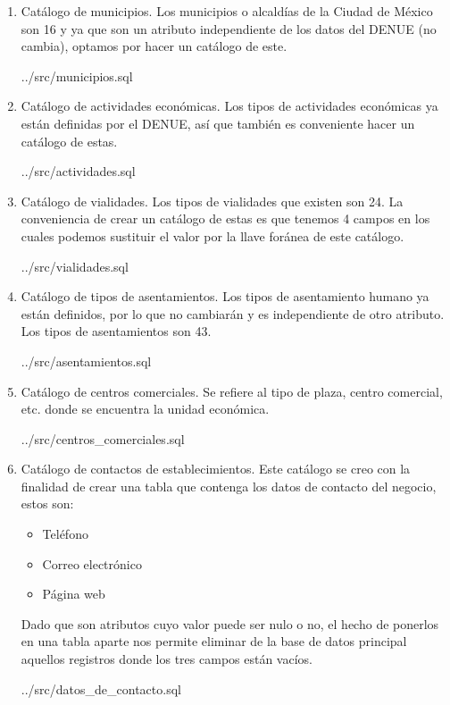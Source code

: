 \documentclass{article}
\begin{document}
\begin{enumerate}
    \item Catálogo de municipios.
    Los municipios o alcaldías de la Ciudad de México son 16 y ya que son un
    atributo independiente de los datos del DENUE (no cambia), optamos por hacer
    un catálogo de este.
    
        {../src/municipios.sql}

    \item Catálogo de actividades económicas.
    Los tipos de actividades económicas ya están definidas por el DENUE, así que
    también es conveniente hacer un catálogo de estas.
    
    {../src/actividades.sql}

    \item Catálogo de vialidades.
    Los tipos de vialidades que existen son 24. La conveniencia de crear un
    catálogo de estas es que tenemos 4 campos en los cuales podemos sustituir el
    valor por la llave foránea de este catálogo.
    
    {../src/vialidades.sql}

    \item Catálogo de tipos de asentamientos.
    Los tipos de asentamiento humano ya están definidos, por lo que no cambiarán
    y es independiente de otro atributo. Los tipos de asentamientos son 43.
    
    {../src/asentamientos.sql}

    \item Catálogo de centros comerciales.
    Se refiere al tipo de plaza, centro comercial, etc. donde se encuentra la
    unidad económica.
    
    {../src/centros_comerciales.sql}

    \item Catálogo de contactos de establecimientos.
    Este catálogo se creo con la finalidad de crear una tabla que contenga los
    datos de contacto del negocio, estos son:

    \begin{itemize}
        \item Teléfono
        \item Correo electrónico
        \item Página web
    \end{itemize}

    Dado que son atributos cuyo valor puede ser nulo o no, el hecho de ponerlos
    en una tabla aparte nos permite eliminar de la base de datos principal
    aquellos registros donde los tres campos están vacíos.

    
    {../src/datos_de_contacto.sql}

\end{enumerate}
\end{document}
